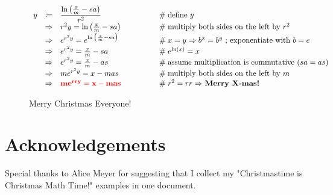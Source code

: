 \documentclass{article}
\theoremstyle{definition}
\begin{document}
\begin{figure} [H]
  \centering                                                            %
   {                                            	%
    \resizebox{0.70 \textwidth}{!} {                                     %
       \begin{math}
          \begin{array}{rcll} 
             y
             &\coloneqq& {\displaystyle \frac{\ln \big (\frac{x}{m} -  sa  \big ) }{r^2}}
                         &\qquad \qquad \mathrel{\#} \text{define $y$} \\
[1pt]
             &\Rightarrow& r^2 y = \ln \big (\frac{x}{m} -  sa  \big )    
                         &\qquad \qquad  \mathrel{\#} \text{multiply both sides on the left by $r^2$} \\
[1pt]
             &\Rightarrow& e^{r^2y} = e^{\ln \big ( \frac{x}{m} -  sa\big )}                           
                         &\qquad \qquad \mathrel{\#} \text{$x = y \Rightarrow b^x =b^y$ ; exponentiate with $b = e$} \\
[1pt]
             &\Rightarrow& e^{r^2y} = \frac{x}{m} -  sa                           
                         &\qquad \qquad \mathrel{\#} e^{\ln(x)} = x \\
[1pt]
             &\Rightarrow& e^{r^2y} = \frac{x}{m} -  as						
                         &\qquad \qquad \mathrel{\#} \text{assume multiplication is commutative $(sa = as)$} \\ 
[1pt]
             &\Rightarrow& m e^{r^2y} = x - mas                                        
                         &\qquad \qquad \mathrel{\#} \text{multiply both sides on the left by $m$} \\
[1pt]
             &\Rightarrow& \bf{\color{red}{m e^{rry} = x - mas}}                                     
                         &\qquad \qquad \mathrel{\#} \text{$r^2 = rr \Rightarrow$ \bf{Merry X-mas!}}
         \end{array}
       \end{math}
        }                                                               %
     }                                                                  %
  \caption{Merry Christmas Everyone!}
  \label{fig:merry_christmas_everyone}
\end{figure}
%
%
%
\section*{Acknowledgements}
\label{sec:acknowledgements}
Special thanks to Alice Meyer for suggesting that I collect my
"Christmastime is Christmas Math Time!" examples in one document.
%
%
\end{document}
